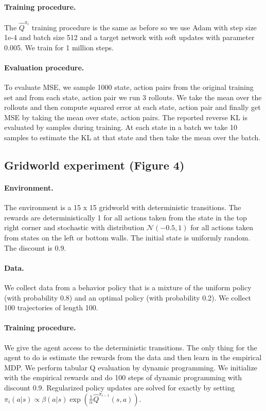 \begin{subappendices}
\paragraph{Training procedure.} The $\widehat Q^{\pi_i}$ training procedure is the same as before so we use Adam with step size 1e-4 and batch size 512 and a target network with soft updates with parameter 0.005. We train for 1 million steps.

\paragraph{Evaluation procedure.} To evaluate MSE, we sample 1000 state, action pairs from the original training set and from each state, action pair we run 3 rollouts. We take the mean over the rollouts and then compute squared error at each state, action pair and finally get MSE by taking the mean over state, action pairs. The reported reverse KL is evaluated by samples during training. At each state in a batch we take 10 samples to estimate the KL at that state and then take the mean over the batch.


\subsection{Gridworld experiment (Figure 4)}

\paragraph{Environment.} The environment is a 15 x 15 gridworld with deterministic transitions. The rewards are deterministically 1 for all actions taken from the state in the top right corner and stochastic with distribution $ \mathcal{N}(-0.5, 1)$ for all actions taken from states on the left or bottom walls. The initial state is uniformly random. The discount is 0.9.

\paragraph{Data.} We collect data from a behavior policy that is a mixture of the uniform policy (with probability 0.8) and an optimal policy (with probability 0.2). We collect 100 trajectories of length 100.

\paragraph{Training procedure.} We give the agent access to the deterministic transitions. The only thing for the agent to do is estimate the rewards from the data and then learn in the empirical MDP. We perform tabular Q evaluation by dynamic programming. We initialize with the empirical rewards and do 100 steps of dynamic programming with discount 0.9. Regularized policy updates are solved for exactly by setting $ \pi_i(a|s) \propto \beta(a|s) \exp(\frac{1}{\alpha} \widehat Q^{\pi_{i-1}}(s,a))$.





\end{subappendices}
